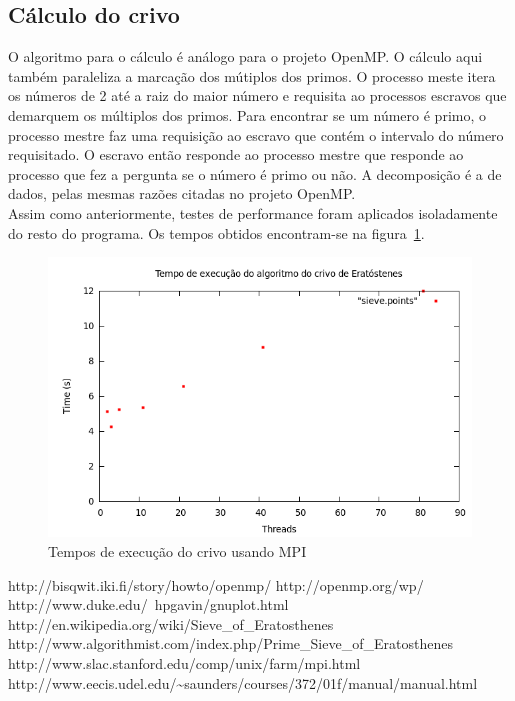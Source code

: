 \documentclass[a4paper]{article}
\begin{document}
\subsection{Cálculo do crivo}
\indent \indent O algoritmo para o cálculo é análogo para o projeto OpenMP. O cálculo aqui também paraleliza a marcação dos mútiplos dos primos. O processo meste itera os números de 2 até a raiz do maior número e requisita ao processos escravos que demarquem os múltiplos dos primos. Para encontrar se um número é primo, o processo mestre faz uma requisição ao escravo que contém o intervalo do número requisitado. O escravo então responde ao processo mestre que responde ao processo que fez a pergunta se o número é primo ou não. A decomposição é a de dados, pelas mesmas razões citadas no projeto OpenMP.\\
\indent Assim como anteriormente, testes de performance foram aplicados isoladamente do resto do programa. Os tempos obtidos encontram-se na figura~\ref{graph-sieve-mpi}.
\begin{figure}[float=p]
	\includegraphics[scale=0.5]{graph-sieve-mpi}
	\caption{Tempos de execução do crivo usando MPI}
	\label{graph-sieve-mpi}
\end{figure}

\newpage
\begin{thebibliography}{99}
	http://bisqwit.iki.fi/story/howto/openmp/
	http://openmp.org/wp/
	http://www.duke.edu/~hpgavin/gnuplot.html
	 http://en.wikipedia.org/wiki/Sieve\_of\_Eratosthenes
	 http://www.algorithmist.com/index.php/Prime\_Sieve\_of\_Eratosthenes
	 http://www.slac.stanford.edu/comp/unix/farm/mpi.html
	 http://www.eecis.udel.edu/\~{}saunders/courses/372/01f/manual/manual.html
\end{thebibliography}
\end{document}
